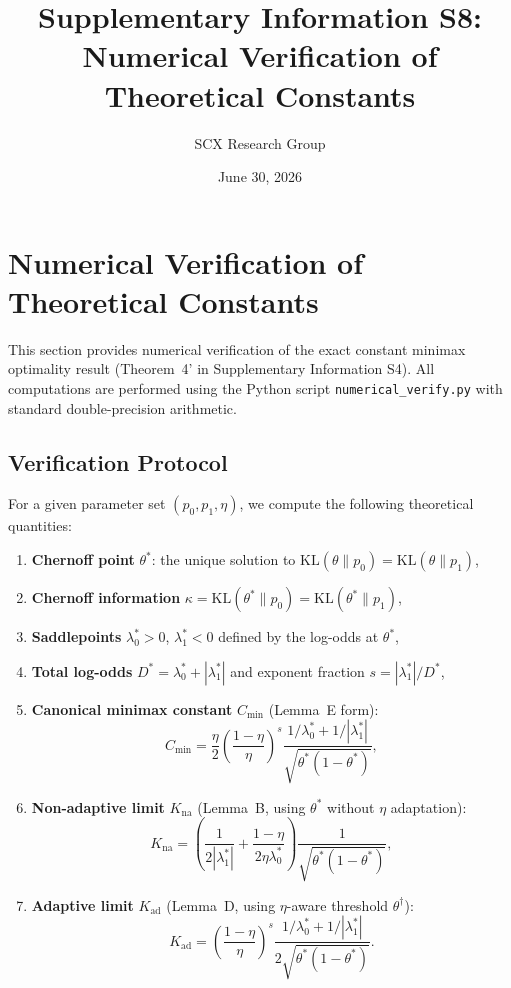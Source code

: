 \documentclass[article]{amsart}
\title{Supplementary Information S8: Numerical Verification of Theoretical Constants}
\author{SCX Research Group}
\date{June 30, 2026}
\theoremstyle{definition}
\begin{document}
\maketitle

\section{Numerical Verification of Theoretical Constants}

This section provides numerical verification of the exact constant minimax optimality result (Theorem~4' in Supplementary Information S4). All computations are performed using the Python script \texttt{numerical\_verify.py} with standard double-precision arithmetic.

\subsection{Verification Protocol}

For a given parameter set $(p_0, p_1, \eta)$, we compute the following theoretical quantities:

\begin{enumerate}
    \item \textbf{Chernoff point} $\theta^*$: the unique solution to $\mathrm{KL}(\theta\|p_0) = \mathrm{KL}(\theta\|p_1)$,
    \item \textbf{Chernoff information} $\kappa = \mathrm{KL}(\theta^*\|p_0) = \mathrm{KL}(\theta^*\|p_1)$,
    \item \textbf{Saddlepoints} $\lambda_0^* > 0$, $\lambda_1^* < 0$ defined by the log-odds at $\theta^*$,
    \item \textbf{Total log-odds} $D^* = \lambda_0^* + |\lambda_1^*|$ and exponent fraction $s = |\lambda_1^*|/D^*$,
    \item \textbf{Canonical minimax constant} $C_{\min}$ (Lemma~E form):
        \begin{equation}
        C_{\min} = \frac{\eta}{2} \left(\frac{1-\eta}{\eta}\right)^{s}
        \frac{1/\lambda_0^* + 1/|\lambda_1^*|}{\sqrt{\theta^*(1-\theta^*)}},
        \end{equation}
    \item \textbf{Non-adaptive limit} $K_{\mathrm{na}}$ (Lemma~B, using $\theta^*$ without $\eta$ adaptation):
        \begin{equation}
        K_{\mathrm{na}} = \left(\frac{1}{2|\lambda_1^*|} + \frac{1-\eta}{2\eta\lambda_0^*}\right) \frac{1}{\sqrt{\theta^*(1-\theta^*)}},
        \end{equation}
    \item \textbf{Adaptive limit} $K_{\mathrm{ad}}$ (Lemma~D, using $\eta$-aware threshold $\theta^\dagger$):
        \begin{equation}
        K_{\mathrm{ad}} = \left(\frac{1-\eta}{\eta}\right)^{s} \frac{1/\lambda_0^* + 1/|\lambda_1^*|}{2\sqrt{\theta^*(1-\theta^*)}}.
        \end{equation}
\end{enumerate}
\end{document}
